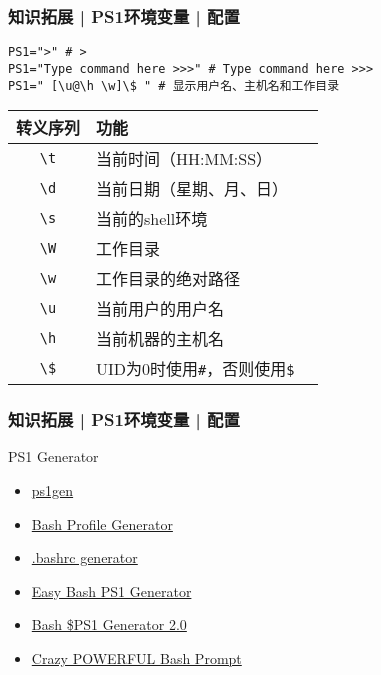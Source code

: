 \begin{frame}[fragile]
  \frametitle{知识拓展 | PS1环境变量 | 配置}
\begin{lstlisting}
PS1=">" # >
PS1="Type command here >>>" # Type command here >>>
PS1=" [\u@\h \w]\$ " # 显示用户名、主机名和工作目录
\end{lstlisting}
  \pause
  \begin{table}
    \centering
    \begin{tabularx}{\textwidth}{cXX}
      \hline
      \rowcolor{blue!50}转义序列 & 功能\\
      \hline
      \verb|\t| & 当前时间（HH:MM:SS）\\
      \verb|\d| & 当前日期（星期、月、日）\\
      \verb|\s| & 当前的shell环境\\
      \verb|\W| & 工作目录\\
      \verb|\w| & 工作目录的绝对路径\\
      \verb|\u| & 当前用户的用户名\\
      \verb|\h| & 当前机器的主机名\\
      \verb|\$| & UID为0时使用\verb|#|，否则使用\verb|$|\\
      \hline
    \end{tabularx}
  \end{table}
\end{frame}

\begin{frame}
  \frametitle{知识拓展 | PS1环境变量 | 配置}
  \begin{block}{PS1 Generator}
    \begin{itemize}
      \item \href{http://omar.io/ps1gen/}{ps1gen}
      \item \href{https://xta.github.io/HalloweenBash/}{Bash Profile Generator}
      \item \href{http://bashrcgenerator.com/}{.bashrc generator}
      \item \href{http://ezprompt.net/}{Easy Bash PS1 Generator}
      \item \href{https://www.kirsle.net/wizards/ps1.html}{Bash \$PS1 Generator 2.0}
      \item \href{https://www.askapache.com/linux/bash-power-prompt/}{Crazy POWERFUL Bash Prompt}
    \end{itemize}
  \end{block}
\end{frame}

